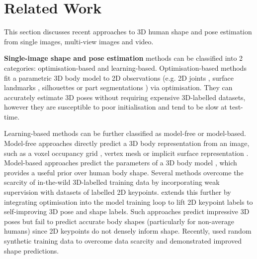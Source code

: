 \documentclass[final]{cvpr}
\begin{document}
\vspace{-0.3cm}
\section{Related Work}

This section discusses recent approaches to 3D human shape and pose estimation from single images, multi-view images and video.

\noindent \textbf{Single-image shape and pose estimation} methods can be classified into 2 categories: optimisation-based and learning-based. Optimisation-based methods fit a parametric 3D body model \cite{SMPL:2015, SMPL-X:2019, Anguelov05scape:shape, Joo_2018_CVPR_total_capture} to 2D observations (e.g. 2D joints \cite{Bogo:ECCV:2016, SMPL-X:2019}, surface landmarks \cite{Lassner:UP:2017}, silhouettes \cite{Lassner:UP:2017} or part segmentations \cite{Zanfir_2018_CVPR}) via optimisation. They can accurately estimate 3D poses without requiring expensive 3D-labelled datasets, however they are susceptible to poor initialisation and tend to be slow at test-time.

Learning-based methods can be further classified as model-free or model-based. Model-free approaches directly predict a 3D body representation from an image, such as a voxel occupancy grid \cite{varol18_bodynet}, vertex mesh \cite{kolotouros2019cmr, Moon_2020_ECCV_I2L-MeshNet, Zeng_2020_CVPR_mesh_dense} or implicit surface representation \cite{saito2020pifuhd}. Model-based approaches \cite{hmrKanazawa17, zhang2019danet, omran2018nbf, pavlakos2018humanshape, tan2017, georgakis2020hkmr, Guler_2019_CVPR_holopose} predict the parameters of a 3D body model \cite{SMPL:2015, SMPL-X:2019, Anguelov05scape:shape, Joo_2018_CVPR_total_capture}, which provides a useful prior over human body shape. Several methods \cite{hmrKanazawa17, kolotouros2019cmr, Guler_2019_CVPR_holopose, Xu_2019_ICCV} overcome the scarcity of in-the-wild 3D-labelled training data by incorporating weak supervision with datasets of labelled 2D keypoints. \cite{kolotouros2019spin} extends this further by integrating optimisation into the model training loop to lift 2D keypoint labels to self-improving 3D pose and shape labels. Such approaches predict impressive 3D poses but fail to predict accurate body shapes (particularly for non-average humans) since 2D keypoints do not densely inform shape. Recently, \cite{STRAPS2020BMVC} used random synthetic training data to overcome data scarcity and demonstrated improved shape predictions.
\end{document}
